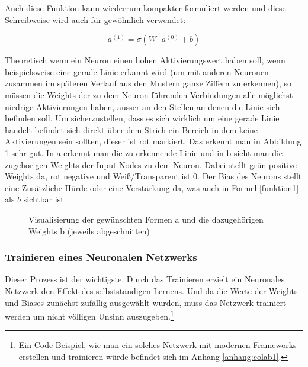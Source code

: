 Auch diese Funktion kann wiederrum kompakter formuliert werden und diese Schreibweise wird auch für gewöhnlich verwendet:

\begin{equation}\label{funktion3}
    a^{(1)}=\sigma(W\cdot a^{(0)}+b)
\end{equation}\footnotemark[22]%

Theoretisch wenn ein Neuron einen hohen Aktivierungswert haben soll, wenn beispielsweise eine gerade Linie erkannt wird (um mit anderen Neuronen zusammen im späteren Verlauf aus den Mustern ganze Ziffern zu erkennen), so müssen die Weights der zu dem Neuron führenden Verbindungen alle möglichst niedrige Aktivierungen haben, ausser an den Stellen an denen die Linie sich befinden soll. Um sicherzustellen, dass es sich wirklich um eine gerade Linie handelt befindet sich direkt über dem Strich ein Bereich in dem keine Aktivierungen sein sollten, dieser ist rot markiert. Das erkennt man in Abbildung \ref{examples} sehr gut. In a erkennt man die zu erkennende Linie und in b sieht man die zugehörigen Weights der Input Nodes zu dem Neuron. Dabei stellt grün positive Weights da, rot negative und Weiß/Transparent ist 0. Der Bias des Neurons stellt eine Zusätzliche Hürde oder eine Verstärkung da, was auch in Formel \ref{funktion1} als $b$ sichtbar ist.

\begin{figure}[H]
    \centering
    \qquad
    \caption[Visualisierung]{Visualisierung der gewünschten Formen a und die dazugehörigen Weights b (jeweils abgeschnitten)}
    \label{examples}%
\end{figure}

\subsubsection{Trainieren eines Neuronalen Netzwerks} \label{backpropagation}

Dieser Prozess ist der wichtigste. Durch das Trainieren erzielt ein Neuronales Netzwerk den Effekt des selbstständigen Lernens. Und da die Werte der Weights und Biases zunächst zufällig ausgewählt wurden, muss das Netzwerk trainiert werden um nicht völligen Unsinn auszugeben.\footnote{Ein Code Beispiel, wie man ein solches Netzwerk mit modernen Frameworks erstellen und trainieren würde befindet sich im Anhang \ref{anhang:colab1}.}

